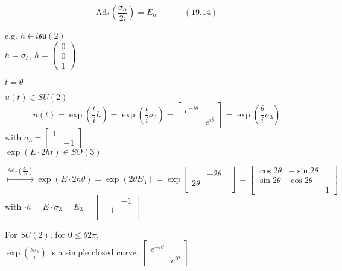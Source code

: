 \begin{equation}
  \text{Ad}_*\left( \frac{\sigma_{\alpha} }{ 2i } \right)  = E_{\alpha} \quad \quad \quad \, (19.14)
\end{equation}

e.g. $h \in i\mathfrak{su}(2)$ \\
\phantom{e.g. } $h = \sigma_3$, $h = \left( \begin{matrix} 0 \\ 0 \\ 1 \end{matrix} \right)$

$t=\theta$

$u(t) \in SU(2)$
\[
u(t) = \exp{ \left( \frac{t}{i} h \right)} = \exp{ \left( \frac{t}{i} \sigma_3 \right)} = \left[ \begin{matrix} e^{-i\theta}  & \\ & e^{i\theta} \end{matrix} \right] = \exp{ \left( \frac{\theta}{i} \sigma_3 \right)}
\]
with $\sigma_3 = \left[ \begin{matrix} 1 & \\ & -1 \end{matrix} \right]$ \\

$\exp{ (E\cdot 2ht )} \in SO(3)$ 

\[
\overset{\text{Ad}_*\left( \frac{\sigma_{\alpha} }{2i} \right) }{ \mapsto } \exp{ (E\cdot 2h\theta)} = \exp{ (2\theta E_3)} = \exp{ \left[ \begin{matrix} & -2\theta & \\ 2\theta & & \\ & & \end{matrix} \right] } = \left[ \begin{matrix} \cos{2\theta} & -\sin{2\theta} & \\ \sin{2\theta} & \cos{2\theta} & \\ & & 1 \end{matrix} \right]
\]
with $\cdot h = E\cdot \sigma_3 = E_3 = \left[ \begin{matrix} & & -1 \\ & 1 & \\ & & \end{matrix} \right]$

For $SU(2)$, for $0\leq \theta 2\pi$, \\
$\exp{ \left( \frac{\theta \sigma_3}{i} \right) } $ is a simple closed curve, $\left[ \begin{matrix} e^{-i\theta} & \\ & e^{i \theta} \end{matrix} \right]$ \\

